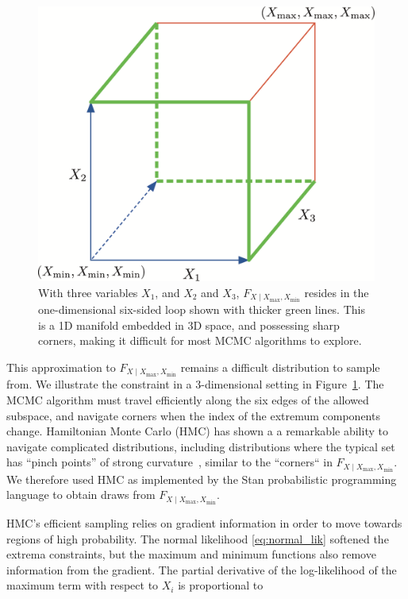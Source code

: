 \documentclass[letter]{article}
\makeatletter
\def\maxwidth{\ifdim\Gin@nat@width>\linewidth\linewidth
\else\Gin@nat@width\fi}
\let\Oldincludegraphics\includegraphics
\renewcommand{\includegraphics}[1]{\Oldincludegraphics[width=.8\maxwidth]{#1}}
\newcommand{\Xmax}{X_{\max}}
\newcommand{\Xmin}{X_{\min}}
\newcommand{\Fcond}{F_{X \mid \Xmax,\Xmin}}
\renewcommand{\cite}[1]{\citep{#1}}
\makeatother
\begin{document}
        \begin{figure}
\centering
\includegraphics{../figures/constraints3d.png}
\caption{\label{fig:constraints3d}
With three variables \(X_1\), and \(X_2\) and \(X_3\), \(\Fcond\) resides in the one-dimensional six-sided loop shown with thicker green lines. This is a 1D manifold embedded in 3D space, and possessing sharp corners, making it difficult for most MCMC algorithms to explore.}
\end{figure}

This approximation to \(\Fcond\) remains a difficult distribution to sample from.
We illustrate the constraint in a 3-dimensional setting in Figure~\ref{fig:constraints3d}.
The MCMC algorithm must travel efficiently along the six edges of the allowed subspace,
and navigate corners when the index of the extremum components change.
Hamiltonian Monte Carlo (HMC) has shown a a remarkable ability to navigate complicated distributions, including distributions where the typical set has ``pinch points'' of strong
curvature~\cite{betancourt2017conceptual}, similar to the ``corners`` in \(\Fcond\).
We therefore used HMC as implemented by the Stan probabilistic programming language \cite{stancite} to obtain draws from \(\Fcond\).
    


        HMC's efficient sampling relies on gradient information in order to move towards regions of high probability.
The normal likelihood \eqref{eq:normal_lik} softened the extrema constraints,
but the maximum and minimum functions also remove information from the gradient.
The partial derivative of the log-likelihood of the maximum term with respect to \(X_i\) is proportional to
\end{document}

